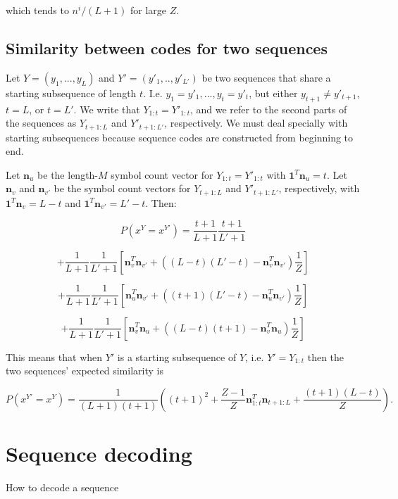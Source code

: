 \documentclass{article}
\begin{document}
which tends to $n^i/(L+1)$ for large $Z$.

\subsection{Similarity between codes for two sequences}

Let $Y = (y_1, ..., y_L)$ and $Y' = (y'_1, .., y'_{L'})$ be two sequences that share a starting subsequence of length $t$. I.e. $y_1 = y'_1, ..., y_t = y'_t$, but either $y_{t+1} \neq y'_{t+1}$, $t = L$, or $t = L'$. We write that $Y_{1:t} = Y'_{1:t}$, and we refer to the second parts of the sequences as $Y_{t+1:L}$ and $Y'_{t+1:L'}$, respectively. We must deal specially with starting subsequences because sequence codes are constructed from beginning to end.

Let $\mathbf{n}_u$ be the length-$M$ symbol count vector for $Y_{1:t} = Y'_{1:t}$ with $\mathbf{1}^T\mathbf{n}_u = t$. Let $\mathbf{n}_v$ and $\mathbf{n}_{v'}$ be the symbol count vectors for $Y_{t+1:L}$ and $Y'_{t+1:L'}$, respectively, with $\mathbf{1}^T\mathbf{n}_{v} = L - t$ and $\mathbf{1}^T\mathbf{n}_{v'} = L' - t$. Then:

$$P(x^Y = x^{Y'}) = \frac{t+1}{L+1}\frac{t+1}{L'+1}$$

$$+ \frac{1}{L+1}\frac{1}{L'+1}\left[\mathbf{n}^T_v\mathbf{n}_{v'} + \left((L-t)(L'-t) - \mathbf{n}^T_v\mathbf{n}_{v'} \right)\frac{1}{Z}\right]
$$

$$+\frac{1}{L+1}\frac{1}{L'+1}\left[
\mathbf{n}^T_{u}\mathbf{n}_{v'} + \left((t+1)(L'-t) - \mathbf{n}^T_{u}\mathbf{n}_{v'} \right)\frac{1}{Z}
\right]
$$

$$+\frac{1}{L+1}\frac{1}{L'+1}\left[
\mathbf{n}^T_{v}\mathbf{n}_{u} + \left((L-t)(t+1) - \mathbf{n}^T_{v}\mathbf{n}_{u} \right)\frac{1}{Z}
\right]
$$

This means that when $Y'$ is a starting subsequence of $Y$, i.e. $Y' = Y_{1:t}$ then the two sequences' expected similarity is

$$P(x^{Y'} = x^Y) = \frac{1}{(L+1)(t+1)}\left((t+1)^2 + \frac{Z-1}{Z}\mathbf{n}^T_{1:t}\mathbf{n}_{t+1:L} + \frac{(t+1)(L-t)}{Z}\right).$$

\section{Sequence decoding}
How to decode a sequence
\end{document}
